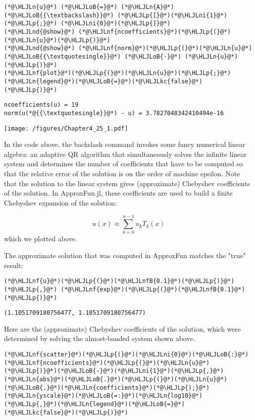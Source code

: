 \documentclass[12pt,landscape]{article}
\newcommand{\HLJLkc}[1]{\textcolor[RGB]{59,151,46}{\textit{#1}}}
\newcommand{\HLJLn}[1]{#1}
\newcommand{\HLJLnd}[1]{\textcolor[RGB]{214,102,97}{#1}}
\newcommand{\HLJLnf}[1]{\textcolor[RGB]{66,102,213}{#1}}
\newcommand{\HLJLnfB}[1]{\textcolor[RGB]{59,151,46}{#1}}
\newcommand{\HLJLni}[1]{\textcolor[RGB]{59,151,46}{#1}}
\newcommand{\HLJLoB}[1]{\textcolor[RGB]{102,102,102}{\textbf{#1}}}
\newcommand{\HLJLp}[1]{#1}
\begin{document}
{\begin{lstlisting}
(*@\HLJLn{u}@*) (*@\HLJLoB{=}@*) (*@\HLJLn{A}@*) (*@\HLJLoB{{\textbackslash}}@*) (*@\HLJLp{[}@*)(*@\HLJLni{1}@*)(*@\HLJLp{;}@*) (*@\HLJLni{0}@*)(*@\HLJLp{]}@*)
(*@\HLJLnd{@show}@*) (*@\HLJLnf{ncoefficients}@*)(*@\HLJLp{(}@*)(*@\HLJLn{u}@*)(*@\HLJLp{)}@*)
(*@\HLJLnd{@show}@*) (*@\HLJLnf{norm}@*)(*@\HLJLp{(}@*)(*@\HLJLn{u}@*)(*@\HLJLoB{{\textquotesingle}}@*) (*@\HLJLoB{-}@*) (*@\HLJLn{u}@*)(*@\HLJLp{)}@*)
(*@\HLJLnf{plot}@*)(*@\HLJLp{(}@*)(*@\HLJLn{u}@*)(*@\HLJLp{;}@*)(*@\HLJLn{legend}@*)(*@\HLJLoB{=}@*)(*@\HLJLkc{false}@*)(*@\HLJLp{)}@*)
\end{lstlisting}

\begin{lstlisting}
ncoefficients(u) = 19
norm(u(*@{{\textquotesingle}}@*) - u) = 3.7827048342410494e-16
\end{lstlisting}

\texttt{[image: /figures/Chapter4\_25\_1.pdf]}

In the code above, the backslash command invokes some fancy numerical linear algebra: an adaptive QR algorithm that simultaneously solves the infinite linear system and determines the number of coefficients that have to be computed so that the relative error of the solution is on the order of machine epsilon.  Note that the solution to the linear system gives (approximate) Chebyshev coefficients of the solution.  In ApproxFun.jl, these coefficients are used to build a finite Chebyshev expansion of the solution:

\[
u(x) \approx \sum_{k = 0}^{n-1}u_kT_k(x)
\]
which we plotted above.

The approximate solution that was computed in ApproxFun matches the "true" result:


\begin{lstlisting}
(*@\HLJLnf{u}@*)(*@\HLJLp{(}@*)(*@\HLJLnfB{0.1}@*)(*@\HLJLp{)}@*) (*@\HLJLp{,}@*) (*@\HLJLnf{exp}@*)(*@\HLJLp{(}@*)(*@\HLJLnfB{0.1}@*)(*@\HLJLp{)}@*)
\end{lstlisting}

\begin{lstlisting}
(1.1051709180756477, 1.1051709180756477)
\end{lstlisting}


Here are the (approximate) Chebyshev coefficients of the solution, which were determined by solving the almost-banded system shown above.


\begin{lstlisting}
(*@\HLJLnf{scatter}@*)(*@\HLJLp{(}@*)(*@\HLJLni{0}@*)(*@\HLJLoB{:}@*)(*@\HLJLnf{ncoefficients}@*)(*@\HLJLp{(}@*)(*@\HLJLn{u}@*)(*@\HLJLp{)}@*)(*@\HLJLoB{-}@*)(*@\HLJLni{1}@*)(*@\HLJLp{,}@*)(*@\HLJLn{abs}@*)(*@\HLJLoB{.}@*)(*@\HLJLp{(}@*)(*@\HLJLn{u}@*)(*@\HLJLoB{.}@*)(*@\HLJLn{coefficients}@*)(*@\HLJLp{);}@*)(*@\HLJLn{yscale}@*)(*@\HLJLoB{=:}@*)(*@\HLJLn{log10}@*)(*@\HLJLp{,}@*)(*@\HLJLn{legend}@*)(*@\HLJLoB{=}@*)(*@\HLJLkc{false}@*)(*@\HLJLp{)}@*)
\end{lstlisting}

}
\end{document}
